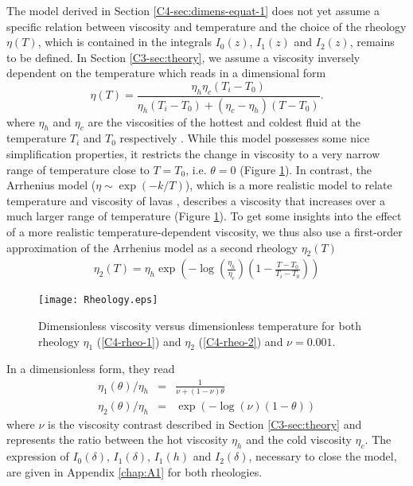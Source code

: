 The model derived in  Section \ref{C4-sec:dimens-equat-1} does not yet
assume a specific  relation between viscosity and  temperature and the
choice of the rheology $\eta(T)$,  which is contained in the integrals
$I_0(z)$, $I_1(z)$  and $I_2(z)$, remains  to be defined.   In Section
\ref{C3-sec:theory}, we assume a  viscosity inversely dependent on the
temperature which reads in a dimensional form
\begin{equation}
  \eta(T)=\frac{\eta_h
    \eta_c(T_i-T_0)}{\eta_h(T_i-T_0)+(\eta_c-\eta_h)(T-T_0)}.
\end{equation}
where $\eta_h$  and $\eta_c$  are the viscosities  of the  hottest and
coldest  fluid  at  the   temperature  $T_i$  and  $T_0$  respectively
\citep{Bercovici:2007vc}.   While  this   model  possesses  some  nice
simplification properties, it  restricts the change in  viscosity to a
very narrow  range of  temperature close  to $T=T_0$,  i.e. $\theta=0$
(Figure   \ref{C4-Rheology}).   In   contrast,  the   Arrhenius  model
($\eta \sim  \exp(-k/T)$), which is  a more realistic model  to relate
temperature and viscosity of lavas \citep{Blatt:2ViMWPc0}, describes a
viscosity  that increases  over  a much  larger  range of  temperature
(Figure \ref{C4-Rheology}).  To get some insights into the effect of a
more  realistic temperature-dependent  viscosity, we  thus also  use a
first-order approximation of the Arrhenius  model as a second rheology
$\eta_2(T)$ \citep{Diniega:2013eh}
\begin{eqnarray}
  \eta_2(T)                          =                          \eta_h
  \exp\left(-\log\left(\frac{\eta_h}{\eta_c}\right)\left(1-\frac{T-T_0}{T_i-T_0}\right)\right)
\end{eqnarray}
\begin{figure}[htbp]
  \begin{center}
    \graphicspath{ {/Users/thorey/Documents/These/Projet/Refroidissement/Skin_Model/Figure/Figure_Heating/} }
    \texttt{[image: Rheology.eps]}
    \caption{Dimensionless viscosity  versus dimensionless temperature
      for  both  rheology   $\eta_1$  (\ref{C4-rheo-1})  and  $\eta_2$
      (\ref{C4-rheo-2}) and $\nu=0.001$.}
    \label{C4-Rheology}
  \end{center}
\end{figure}
In a dimensionless form, they read
\begin{eqnarray}
  \eta_1(\theta)/\eta_h&=&\frac{1}{\nu+(1-\nu)\theta} \label{C4-rheo-1}\\
  \eta_2(\theta)/\eta_h&=&\exp\left(-\log(\nu)\left(1-\theta\right)\right)  \label{C4-rheo-2}
\end{eqnarray}
where   $\nu$  is   the  viscosity   contrast  described   in  Section
\ref{C3-sec:theory} and represents the ratio between the hot viscosity
$\eta_h$  and   the  cold  viscosity  $\eta_c$.    The  expression  of
$I_0(\delta)$, $I_1(\delta)$, $I_1(h)$ and $I_2(\delta)$, necessary to
close  the  model,  are  given  in  Appendix  \ref{chap:A1}  for  both
rheologies.

